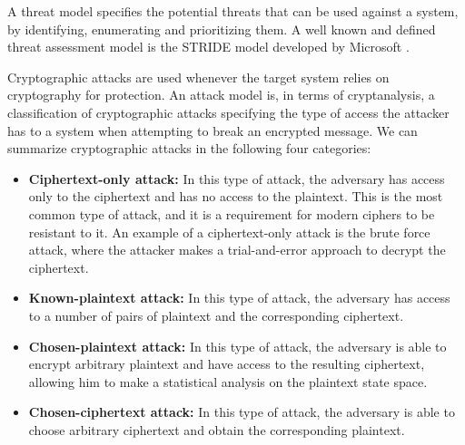 A threat model specifies the potential threats that can be used against a system, by identifying, enumerating and prioritizing them. A well known and defined threat assessment model is the STRIDE model developed by Microsoft \cite{hafiz2007organizing}.

Cryptographic attacks are used whenever the target system relies on cryptography for protection. An attack model is, in terms of cryptanalysis, a classification of cryptographic attacks specifying the type of access the attacker has to a system when attempting to break an encrypted message. We can summarize cryptographic attacks in the following four categories:

 \begin{itemize}

    \item \textbf{Ciphertext-only attack:} In this type of attack, the adversary has access only to the ciphertext and has no access to the plaintext. This is the most common type of attack, and it is a requirement for modern ciphers to be resistant to it. An example of a ciphertext-only attack is the brute force attack, where the attacker makes a trial-and-error approach to decrypt the ciphertext.

    \item \textbf{Known-plaintext attack:} In this type of attack, the adversary has access to a number of pairs of plaintext and the corresponding ciphertext.

    \item \textbf{Chosen-plaintext attack:} In this type of attack, the adversary is able to encrypt arbitrary plaintext and have access to the resulting ciphertext, allowing him to make a statistical analysis on the plaintext state space.

    \item \textbf{Chosen-ciphertext attack:} In this type of attack, the adversary is able to choose arbitrary ciphertext and obtain the corresponding plaintext.
\end{itemize}



%

